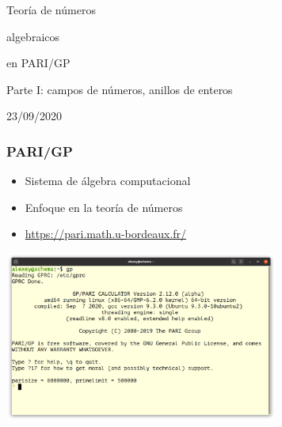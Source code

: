 \documentclass{beamer}
\begin{document}

\begin{frame}[noframenumbering]
  \headingfont
  \begin{center}
    {\huge Teoría de números

      algebraicos

      en PARI/GP

    }

    \vspace{3em}

    {\large Parte I: campos de números, anillos de enteros}

    \vspace{3em}

    23/09/2020

  \end{center}
\end{frame}


\begin{frame}
  \frametitle{PARI/GP}

  \begin{itemize}
  \item Sistema de álgebra computacional

  \item Enfoque en la teoría de números

  \item \url{https://pari.math.u-bordeaux.fr/}
  \end{itemize}

  \begin{center}
    \includegraphics[width=9cm]{pari-terminal.png}
  \end{center}
\end{frame}

\end{document}
